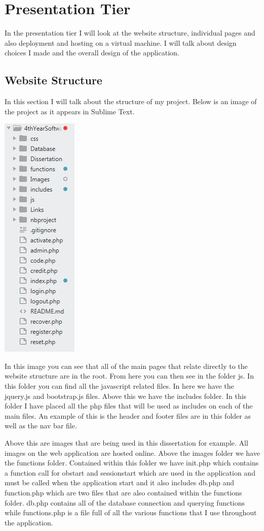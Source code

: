 \section{Presentation Tier}
In the presentation tier I will look at the website structure, individual pages and also deployment and hosting on a virtual machine. I will talk about design choices I made and the overall design of the application. 

\subsection{Website Structure}
In this section I will talk about the structure of my project. Below is an image of the project as it appears in Sublime Text.

\includegraphics{img/structure.png}

In this image you can see that all of the main pages that relate directly to the website structure are in the root. From here you can then see in the folder js. In this folder you can find all the javascript related files. In here we have the jquery.js and bootstrap.js files. Above this we have the includes folder. In this folder I have placed all the php files that will be used as includes on each of the main files. An example of this is the header and footer files are in this folder as well as the nav bar file. 

Above this are images that are being used in this dissertation for example. All images on the web application are hosted online. Above the images folder we have the functions folder. Contained within this folder we have init.php which contains a function call for obstart and sessionstart which are used in the application and must be called when the application start and it also includes db.php and function.php which are two files that are also contained within the functions folder. db.php contains all of the database connection and querying functions while functions.php is a file full of all the various functions that I use throughout the application.

